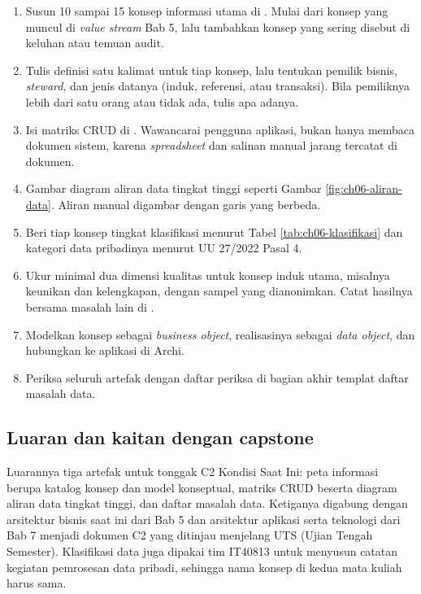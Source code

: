 \begin{enumerate}
  \item Susun 10 sampai 15 konsep informasi utama di
        . Mulai
        dari konsep yang muncul di \textit{value stream} Bab 5, lalu tambahkan
        konsep yang sering disebut di keluhan atau temuan audit.
  \item Tulis definisi satu kalimat untuk tiap konsep, lalu tentukan pemilik
        bisnis, \textit{steward}, dan jenis datanya (induk, referensi, atau
        transaksi). Bila pemiliknya lebih dari satu orang atau tidak ada,
        tulis apa adanya.
  \item Isi matriks CRUD di .
        Wawancarai pengguna aplikasi, bukan hanya membaca dokumen sistem, karena
        \textit{spreadsheet} dan salinan manual jarang tercatat di dokumen.
  \item Gambar diagram aliran data tingkat tinggi seperti Gambar
        \ref{fig:ch06-aliran-data}. Aliran manual digambar dengan garis yang
        berbeda.
  \item Beri tiap konsep tingkat klasifikasi menurut Tabel
        \ref{tab:ch06-klasifikasi} dan kategori data pribadinya menurut UU
        27/2022 Pasal 4.
  \item Ukur minimal dua dimensi kualitas untuk konsep induk utama, misalnya
        keunikan dan kelengkapan, dengan sampel yang dianonimkan. Catat hasilnya
        bersama masalah lain di
        .
  \item Modelkan konsep sebagai \textit{business object}, realisasinya sebagai
        \textit{data object}, dan hubungkan ke aplikasi di Archi.
  \item Periksa seluruh artefak dengan daftar periksa di bagian akhir templat
        daftar masalah data.
\end{enumerate}

\subsection*{Luaran dan kaitan dengan capstone}

Luarannya tiga artefak untuk tonggak C2 Kondisi Saat Ini: peta informasi
berupa katalog konsep dan model konseptual, matriks CRUD beserta diagram
aliran data tingkat tinggi, dan daftar masalah data. Ketiganya digabung dengan
arsitektur bisnis saat ini dari Bab 5 dan arsitektur aplikasi serta teknologi
dari Bab 7 menjadi dokumen C2 yang ditinjau menjelang UTS (Ujian Tengah
Semester). Klasifikasi data juga dipakai tim IT40813 untuk menyusun catatan
kegiatan pemrosesan data pribadi, sehingga nama konsep di kedua mata kuliah
harus sama.

